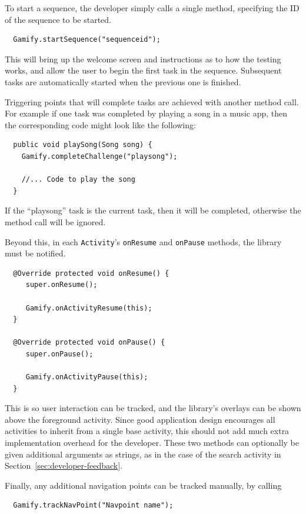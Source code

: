 To start a sequence, the developer simply calls a single method,
specifying the ID of the sequence to be started.

\begin{verbatim}
  Gamify.startSequence("sequenceid");
\end{verbatim}

This will bring up the welcome screen and instructions as to how
the testing works, and allow the user to begin the first task in
the sequence. Subsequent tasks are automatically started when the
previous one is finished.

Triggering points that will complete tasks are achieved with another
method call. For example if one task was completed by playing a
song in a music app, then the corresponding code might look like
the following:

\begin{verbatim}
  public void playSong(Song song) {
    Gamify.completeChallenge("playsong");

    //... Code to play the song
  }
\end{verbatim}

If the ``playsong'' task is the current task, then it will be
completed, otherwise the method call will be ignored.

Beyond this, in each \verb|Activity|'s \verb|onResume| and
\verb|onPause| methods, the library must be notified.

\begin{verbatim}
  @Override protected void onResume() {
     super.onResume();

     Gamify.onActivityResume(this);
  }

  @Override protected void onPause() {
     super.onPause();

     Gamify.onActivityPause(this);
  }
\end{verbatim}

This is so user interaction can be tracked, and the library's
overlays can be shown above the foreground activity. Since good application
design encourages all activities to inherit from a single
base activity, this should not add much extra implementation overhead for the
developer. These two methods can optionally be given additional
arguments as strings, as in the case of the search activity in
Section~\ref{sec:developer-feedback}.

Finally, any additional navigation points can be tracked manually,
by calling

\begin{verbatim}
  Gamify.trackNavPoint("Navpoint name");
\end{verbatim}

